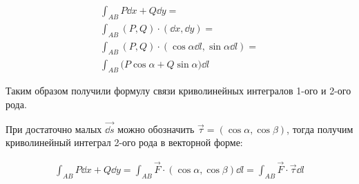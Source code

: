 
\begin{multicols}{2}
  
  \columnbreak

  \begin{align*}
    \int_{AB} P \dd x + Q \dd y = \\
    \int_{AB} (P, Q) \cdot (\dd x, \dd y) = \\
    \int_{AB} (P, Q) \cdot (\cos \alpha \dd l, \sin \alpha \dd l) = \\
    \int_{AB} \Big( P \cos \alpha + Q \sin \alpha \Big) \dd l
  \end{align*}
\end{multicols}

Таким образом получили формулу связи криволинейных интегралов 1-ого и 2-ого
рода.

\begin{remark}
  При достаточно малых \(\vec{\dd s}\) можно обозначить
  \(\vec{\tau} = (\cos \alpha, \cos \beta)\),
  тогда получим криволинейный интеграл 2-ого рода в векторной форме:

  \begin{align*}
    \int_{AB} P \dd x + Q \dd y
    = \int_{AB} \vec{F} \cdot (\cos \alpha, \cos \beta) \dd l
    = \int_{AB} \vec{F} \cdot \vec{\tau} \dd l
  \end{align*}
\end{remark}